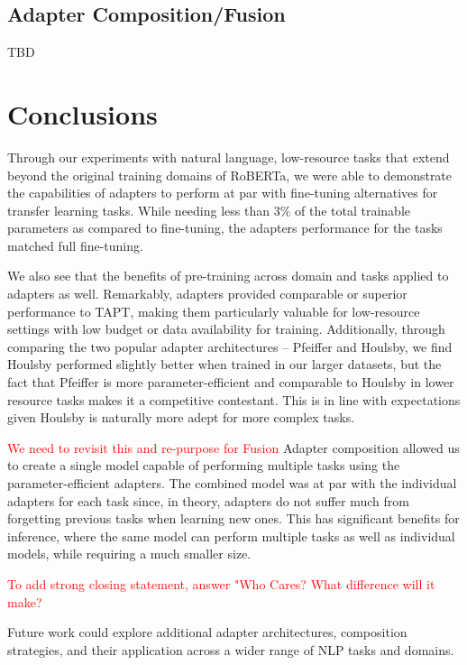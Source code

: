 \documentclass[10pt,twocolumn,letterpaper]{article}
\begin{document}
\subsection{Adapter Composition/Fusion}
TBD









\section{Conclusions}
Through our experiments with natural language, low-resource tasks that extend beyond the original training domains of RoBERTa, we were able to demonstrate the capabilities of adapters to perform at par with fine-tuning alternatives for transfer learning tasks. While needing less than 3\% of the total trainable parameters as compared to fine-tuning, the adapters performance for the tasks matched full fine-tuning.

We also see that the benefits of pre-training across domain and tasks applied to adapters as well. Remarkably, adapters provided comparable or superior performance to TAPT, making them particularly valuable for low-resource settings with low budget or data availability for training. Additionally, through comparing the two popular adapter architectures – Pfeiffer and Houlsby, we find Houlsby performed slightly better when trained in our larger datasets, but the fact that Pfeiffer is more parameter-efficient and comparable to Houlsby in lower resource tasks makes it a competitive contestant. This is in line with expectations given Houlsby is naturally more adept for more complex tasks.

\textcolor{red}{We need to revisit this and re-purpose for Fusion}
Adapter composition allowed us to create a single model capable of performing multiple tasks using the parameter-efficient adapters. The combined model was at par with the individual adapters for each task since, in theory, adapters do not suffer much from forgetting previous tasks when learning new ones. This has significant benefits for inference, where the same model can perform multiple tasks as well as individual models, while requiring a much smaller size.

\textcolor{red}{To add strong closing statement, answer "Who Cares? What difference will it make?}

Future work could explore additional adapter architectures, composition strategies, and their application across a wider range of NLP tasks and domains.
\end{document}
